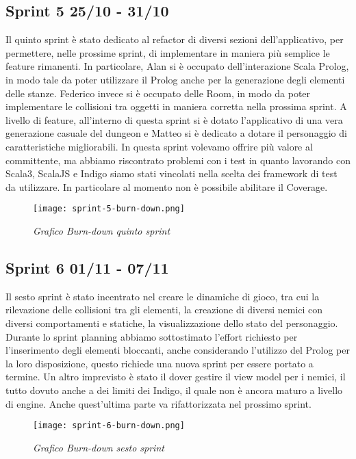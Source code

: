 \newpage
\subsection{Sprint 5 25/10 - 31/10}
Il quinto sprint è stato dedicato al refactor di diversi sezioni dell'applicativo, per permettere, nelle prossime sprint, di implementare in maniera più semplice le feature rimanenti.  
In particolare, Alan si è occupato dell'interazione Scala Prolog, in modo tale da poter utilizzare il Prolog anche per la generazione degli elementi delle stanze. Federico invece si è occupato delle Room, in modo da poter implementare le collisioni tra oggetti in maniera corretta nella prossima sprint. 
A livello di feature, all'interno di questa sprint si è dotato l'applicativo di una vera generazione casuale del dungeon e Matteo si è dedicato a dotare il personaggio di caratteristiche migliorabili. 
In questa sprint volevamo offrire più valore al committente, ma abbiamo riscontrato problemi con i test in quanto lavorando con Scala3, ScalaJS e Indigo siamo stati vincolati nella scelta dei framework di test da utilizzare. In particolare al momento non è possibile abilitare il Coverage.

\begin{figure}[H]
    \centering
    \texttt{[image: sprint-5-burn-down.png]}
    \caption{\textit{Grafico Burn-down quinto sprint}} 
\end{figure}

\newpage
\subsection{Sprint 6 01/11 - 07/11}
Il sesto sprint è stato incentrato nel creare le dinamiche di gioco, tra cui la rilevazione delle collisioni tra gli elementi, la creazione di diversi nemici con diversi comportamenti e statiche, la visualizzazione dello stato del personaggio. 
Durante lo sprint planning abbiamo sottostimato l'effort richiesto per l'inserimento degli elementi bloccanti, anche considerando l'utilizzo del Prolog per la loro disposizione, questo richiede una nuova sprint per essere portato a termine. Un altro imprevisto è stato il dover gestire il view model per i nemici, il tutto dovuto anche a dei limiti dei Indigo, il quale non è ancora maturo a livello di engine. Anche quest'ultima parte va rifattorizzata nel prossimo sprint.
\begin{figure}[H]
    \centering
    \texttt{[image: sprint-6-burn-down.png]}
    \caption{\textit{Grafico Burn-down sesto sprint}} 
\end{figure}

